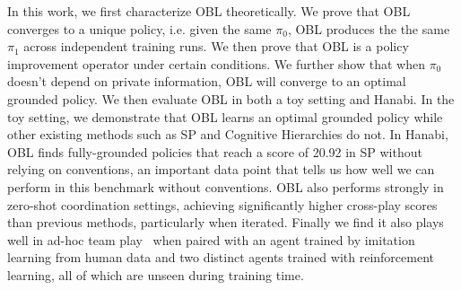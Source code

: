 In this work, we first characterize OBL theoretically. We prove that OBL converges to a unique policy, i.e. given the same $\pi_0$, OBL produces the the same $\pi_1$ across independent training runs. We then prove that OBL is a policy improvement operator under certain conditions. We further show that when $\pi_0$ doesn't depend on private information, OBL will converge to an optimal grounded policy.
We then evaluate OBL in both a toy setting and Hanabi. In the toy setting, we demonstrate that OBL learns an optimal grounded policy while other existing methods such as SP and Cognitive Hierarchies do not. In Hanabi, OBL finds fully-grounded policies that reach a score of 20.92 in SP without relying on conventions, an important data point that tells us how well we can perform in this benchmark without conventions. OBL also performs strongly in zero-shot coordination settings, achieving significantly higher cross-play scores than previous methods, particularly when iterated. Finally we find it also plays well in ad-hoc team play~\cite{stone2010ad} when paired with an agent trained by imitation learning from human data and two distinct agents trained with reinforcement learning, all of which are unseen during training time.




